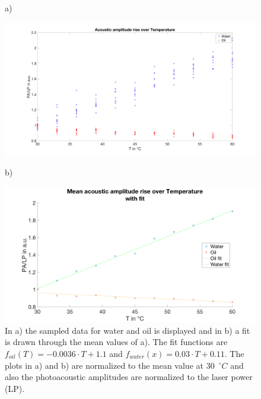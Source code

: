 \begin{figure}[H]
a)
\begin{minipage}{\textwidth}

	\includegraphics[width = \textwidth, height=0.35\textheight]{04_ex-results_of_PAM/images/GRproof.png}
\end{minipage}
b)
\begin{minipage}{\textwidth}

	\includegraphics[width = \textwidth, height=0.35\textheight]{04_ex-results_of_PAM/images/meanGRproof.png}
\end{minipage}

\caption{In a) the sampled data for water and oil is displayed and in b) a fit is drawn through the mean values of a). The fit functions are $f_{oil}(T) = -0.0036 \cdot T +1.1$ and $f_{water}(x) = 0.03 \cdot T + 0.11$. The plots in a) and b) are normalized to the mean value at 30~$^\circ C$ and also the photoacoustic amplitudes are normalized to the laser power (LP).}
\label{fig:measuredGRproof}
\end{figure}

